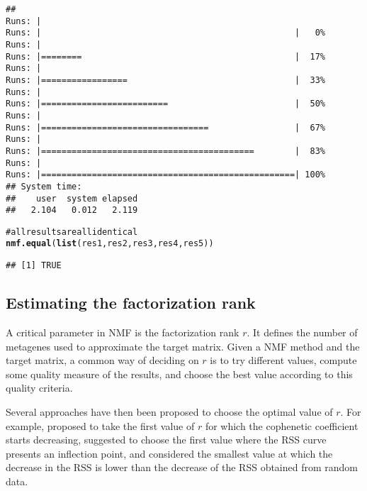 \documentclass[a4paper]{article}\usepackage{graphicx, color}
\makeatletter
\newcommand{\hlfunctioncall}[1]{\textcolor[rgb]{0.501960784313725,0,0.329411764705882}{\textbf{#1}}}%
\newcommand{\hlcomment}[1]{\textcolor[rgb]{0.180392156862745,0.6,0.341176470588235}{#1}}%
\newenvironment{kframe}{%
 \def\at@end@of@kframe{}%
 \ifinner\ifhmode%
  \def\at@end@of@kframe{\end{minipage}}%
  \begin{minipage}{\columnwidth}%
 \fi\fi%
 \def\FrameCommand##1{\hskip\@totalleftmargin \hskip-\fboxsep
 \colorbox{shadecolor}{##1}\hskip-\fboxsep
     \hskip-\linewidth \hskip-\@totalleftmargin \hskip\columnwidth}%
 \MakeFramed {\advance\hsize-\width
   \@totalleftmargin\z@ \linewidth\hsize
   \@setminipage}}%
 {\par\unskip\endMakeFramed%
 \at@end@of@kframe}
\newenvironment{knitrout}{}{} %
\renewcommand{\cite}[1]{\parencite{#1}}
\makeatother
\begin{document}
\begin{knitrout}
\begin{kframe}
{\ttfamily\noindent\itshape\color{messagecolor}{\#\# Mode: sequential [foreach:doSEQ]}}\begin{verbatim}
## 
Runs: |                                                        
Runs: |                                                  |   0%
Runs: |                                                        
Runs: |========                                          |  17%
Runs: |                                                        
Runs: |=================                                 |  33%
Runs: |                                                        
Runs: |=========================                         |  50%
Runs: |                                                        
Runs: |=================================                 |  67%
Runs: |                                                        
Runs: |==========================================        |  83%
Runs: |                                                        
Runs: |==================================================| 100%
## System time:
##    user  system elapsed 
##   2.104   0.012   2.119
\end{verbatim}
\begin{alltt}

\hlcomment{# all results are all identical}
\hlfunctioncall{nmf.equal}(\hlfunctioncall{list}(res1, res2, res3, res4, res5))
\end{alltt}
\begin{verbatim}
## [1] TRUE
\end{verbatim}
\end{kframe}
\end{knitrout}



\subsection{Estimating the factorization rank}
A critical parameter in NMF is the factorization rank $r$. 
It defines the number of metagenes used to approximate the target matrix.
Given a NMF method and the target matrix, a common way of deciding on $r$ is to try different values, compute some quality measure of the results, and choose the best value according to this quality criteria.

Several approaches have then been proposed to choose the optimal value of $r$.
For example, \cite{Brunet2004} proposed to take the first value of $r$ for which the cophenetic coefficient starts decreasing, \cite{Hutchins2008} suggested to choose the first value where the RSS curve presents an inflection point, and \cite{Frigyesi2008} considered the smallest value at which the decrease in the RSS is lower than the decrease of the RSS obtained from random data.
\end{document}
